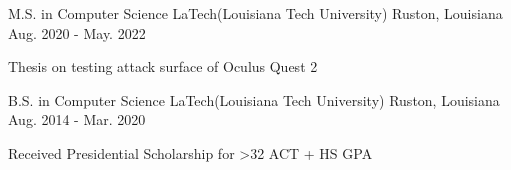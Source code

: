 

\begin{cventries}

  \cventry
    {M.S. in Computer Science} %
    {LaTech(Louisiana Tech University)} %
    {Ruston, Louisiana} %
    {Aug. 2020 - May. 2022} %
    {
      \begin{cvitems} %
        \item {Thesis on testing attack surface of Oculus Quest 2}
      \end{cvitems}
    }


  \cventry
    {B.S. in Computer Science} %
    {LaTech(Louisiana Tech University)} %
    {Ruston, Louisiana} %
    {Aug. 2014 - Mar. 2020} %
    {
      \begin{cvitems} %
        \item {Received Presidential Scholarship for >32 ACT + HS GPA}
      \end{cvitems}
    }

\end{cventries}
